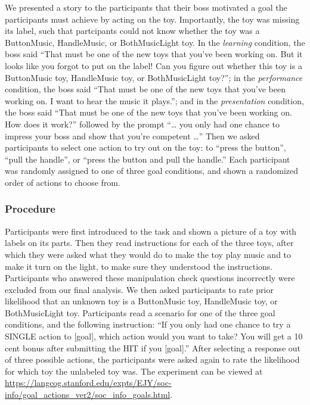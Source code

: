 \documentclass[10pt, letterpaper]{article}
\begin{document}
We presented a story to the participants that their boss motivated a
goal the participants must achieve by acting on the toy. Importantly,
the toy was missing its label, such that partcipants could not know
whether the toy was a ButtonMusic, HandleMusic, or BothMusicLight toy.
In the \emph{learning} condition, the boss said ``That must be one of
the new toys that you've been working on. But it looks like you forgot
to put on the label! Can you figure out whether this toy is a
ButtonMusic toy, HandleMusic toy, or BothMusicLight toy?''; in the
\emph{performance} condition, the boss said ``That must be one of the
new toys that you've been working on. I want to hear the music it
plays.''; and in the \emph{presentation} condition, the boss said ``That
must be one of the new toys that you've been working on. How does it
work?'' followed by the prompt ``\ldots{} you only had one chance to
impress your boss and show that you're competent \ldots{}'' Then we
asked participants to select one action to try out on the toy: to
``press the button'', ``pull the handle'', or ``press the button and
pull the handle.'' Each participant was randomly assigned to one of
three goal conditions, and shown a randomized order of actions to choose
from.

\subsubsection{Procedure}\label{procedure}

Participants were first introduced to the task and shown a picture of a
toy with labels on its parts. Then they read instructions for each of
the three toys, after which they were asked what they would do to make
the toy play music and to make it turn on the light, to make sure they
understood the instructions. Participants who answered these
manipulation check questions incorrectly were excluded from our final
analysis. We then asked participants to rate prior likelihood that an
unknown toy is a ButtonMusic toy, HandleMusic toy, or BothMusicLight
toy. Participants read a scenario for one of the three goal conditions,
and the following instruction: ``If you only had one chance to try a
SINGLE action to {[}goal{]}, which action would you want to take? You
will get a 10 cent bonus after submitting the HIT if you {[}goal{]}.''
After selecting a response out of three possible actions, the
participants were asked again to rate the likelihood for which toy the
unlabeled toy was. The experiment can be viewed at
\url{https://langcog.stanford.edu/expts/EJY/soc-info/goal_actions_ver2/soc_info_goals.html}.
\end{document}
